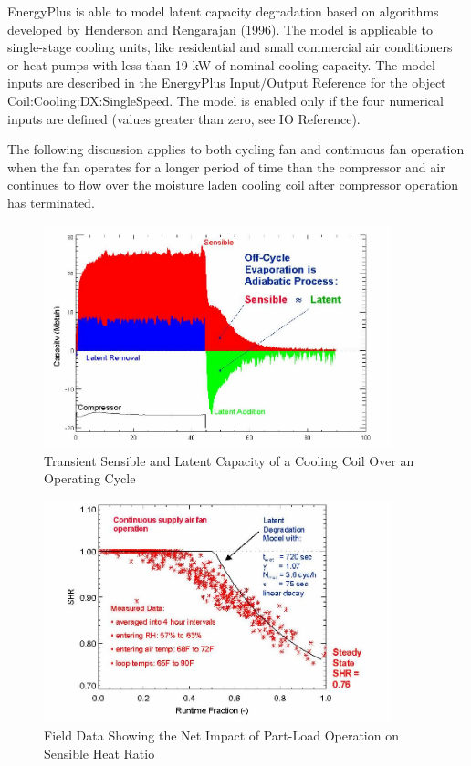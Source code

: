 EnergyPlus is able to model latent capacity degradation based on algorithms developed by Henderson and Rengarajan (1996). The model is applicable to single-stage cooling units, like residential and small commercial air conditioners or heat pumps with less than 19 kW of nominal cooling capacity. The model inputs are described in the EnergyPlus Input/Output Reference for the object Coil:Cooling:DX:SingleSpeed. The model is enabled only if the four numerical inputs are defined (values greater than zero, see IO Reference).

The following discussion applies to both cycling fan and continuous fan operation when the fan operates for a longer period of time than the compressor and air continues to flow over the moisture laden cooling coil after compressor operation has terminated.

\begin{figure}[hbtp] %
\centering
\includegraphics[width=0.9\textwidth, height=0.9\textheight, keepaspectratio=true]{media/image3484.png}
\caption{Transient Sensible and Latent Capacity of a Cooling Coil Over an Operating Cycle \protect \label{fig:transient-sensible-and-latent-capacity-of-a}}
\end{figure}

\begin{figure}[hbtp] %
\centering
\includegraphics[width=0.9\textwidth, height=0.9\textheight, keepaspectratio=true]{media/image3485.png}
\caption{Field Data Showing the Net Impact of Part-Load Operation on Sensible Heat Ratio \protect \label{fig:field-data-showing-the-net-impact-of-part}}
\end{figure}

